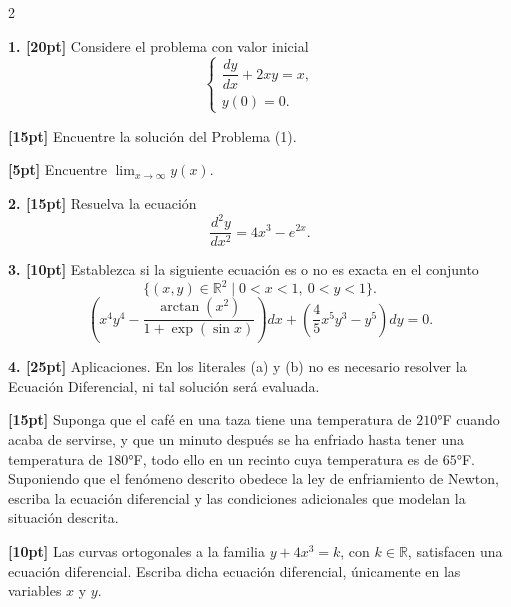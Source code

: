 \documentclass[11pt]{article}
\begin{document}
\begin{multicols}{2}

\textbf{1. [20pt]} Considere el problema con valor inicial
\[
\begin{cases}
\dfrac{dy}{dx}+2xy=x, \\[4pt]
y(0)=0.
\end{cases}
\tag{1}
\]

\begin{opciones}
\item[(a)] \textbf{[15pt]} Encuentre la solución del Problema (1).

\vspace{3cm}

\item[(b)] \textbf{[5pt]} Encuentre $\displaystyle\lim_{x\to\infty} y(x)$.

\vspace{2.5cm}
\end{opciones}

\textbf{2. [15pt]} Resuelva la ecuación
\[
\frac{d^2y}{dx^2}=4x^3-e^{2x}.
\]

\vspace{4cm}

\columnbreak

\textbf{3. [10pt]} Establezca si la siguiente ecuación es o no es exacta en el conjunto
\[
\{(x,y)\in\mathbb{R}^2 \mid 0<x<1,\ 0<y<1\}.
\]
\[
\left(x^4y^4-\frac{\arctan(x^2)}{1+\exp(\sin x)}\right)dx+\left(\frac{4}{5}x^5y^3-y^5\right)dy=0.
\]

\vspace{4cm}

\textbf{4. [25pt]} Aplicaciones. En los literales (a) y (b) no es necesario resolver la Ecuación Diferencial, ni tal solución será evaluada.

\begin{opciones}
\item[(a)] \textbf{[15pt]} Suponga que el café en una taza tiene una temperatura de $210$°F cuando acaba de servirse, y que un minuto después se ha enfriado hasta tener una temperatura de $180$°F, todo ello en un recinto cuya temperatura es de $65$°F. Suponiendo que el fenómeno descrito obedece la ley de enfriamiento de Newton, escriba la ecuación diferencial y las condiciones adicionales que modelan la situación descrita.

\vspace{2.5cm}

\item[(b)] \textbf{[10pt]} Las curvas ortogonales a la familia $y+4x^3=k$, con $k\in\mathbb{R}$, satisfacen una ecuación diferencial. Escriba dicha ecuación diferencial, únicamente en las variables $x$ y $y$.

\vspace{2.5cm}
\end{opciones}

\end{multicols}
\end{document}
